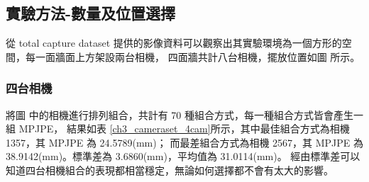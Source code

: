 \subsection{實驗方法-數量及位置選擇}
從 total capture dataset 提供的影像資料可以觀察出其實驗環境為一個方形的空間，每一面牆面上方架設兩台相機，
四面牆共計八台相機，擺放位置如圖 所示。
\subsubsection{四台相機}
將圖 中的相機進行排列組合，共計有 70 種組合方式，每一種組合方式皆會產生一組 MPJPE，
結果如表 \ref{ch3_cameraset_4cam}所示，其中最佳組合方式為相機 1357，其 MPJPE 為 24.5789(mm)；
而最差組合方式為相機 2567，其 MPJPE 為 38.9142(mm)。標準差為 3.6860(mm)，平均值為 31.0114(mm)。
經由標準差可以知道四台相機組合的表現都相當穩定，無論如何選擇都不會有太大的影響。

